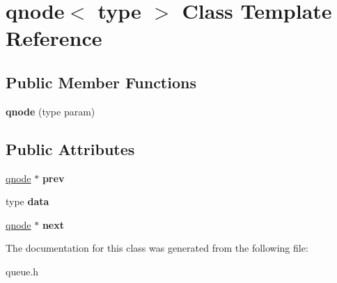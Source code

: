 \hypertarget{classqnode}{}\section{qnode$<$ type $>$ Class Template Reference}
\label{classqnode}
\subsection*{Public Member Functions}
\begin{DoxyCompactItemize}
\item 
{\bfseries qnode} (type param)\hypertarget{classqnode_a46ea3922fb9c45df9df2e43a5ff78158}{}\label{classqnode_a46ea3922fb9c45df9df2e43a5ff78158}

\end{DoxyCompactItemize}
\subsection*{Public Attributes}
\begin{DoxyCompactItemize}
\item 
\hyperlink{classqnode}{qnode} $\ast$ {\bfseries prev}\hypertarget{classqnode_a1b87ab55d98669ab47f834a9d2df8df6}{}\label{classqnode_a1b87ab55d98669ab47f834a9d2df8df6}

\item 
type {\bfseries data}\hypertarget{classqnode_aabcfbd73a031c2cd54938fe283bec962}{}\label{classqnode_aabcfbd73a031c2cd54938fe283bec962}

\item 
\hyperlink{classqnode}{qnode} $\ast$ {\bfseries next}\hypertarget{classqnode_ac13afd7c100ea3f07d5352d19784aea0}{}\label{classqnode_ac13afd7c100ea3f07d5352d19784aea0}

\end{DoxyCompactItemize}


The documentation for this class was generated from the following file\+:\begin{DoxyCompactItemize}
\item 
queue.\+h\end{DoxyCompactItemize}
